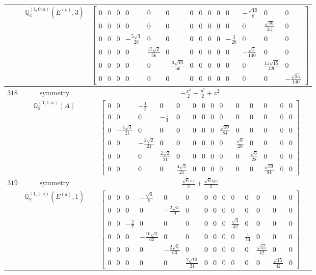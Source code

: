 \documentclass[fleqn,8pt,landscape]{jsarticle}
\begin{document}
\begin{longtable}{ccc}
$  $ & $ \mathbb{Q}_{4}^{(1,0;a)}(E^{(b)},3) $ & $ \begin{bmatrix} 0 & 0 & 0 & 0 & 0 & 0 & 0 & 0 & 0 & 0 & 0 & - \frac{\sqrt{10}}{8} & 0 & 0 \\ 0 & 0 & 0 & 0 & 0 & 0 & 0 & 0 & 0 & 0 & 0 & 0 & \frac{\sqrt{30}}{24} & 0 \\ 0 & 0 & 0 & - \frac{5 \sqrt{3}}{28} & 0 & 0 & 0 & 0 & 0 & 0 & - \frac{3}{28} & 0 & 0 & 0 \\ 0 & 0 & 0 & 0 & \frac{15 \sqrt{2}}{56} & 0 & 0 & 0 & 0 & 0 & 0 & - \frac{\sqrt{5}}{140} & 0 & 0 \\ 0 & 0 & 0 & 0 & 0 & - \frac{3 \sqrt{10}}{56} & 0 & 0 & 0 & 0 & 0 & 0 & \frac{11 \sqrt{15}}{420} & 0 \\ 0 & 0 & 0 & 0 & 0 & 0 & 0 & 0 & 0 & 0 & 0 & 0 & 0 & - \frac{\sqrt{35}}{140} \end{bmatrix} $ \\ \hline
$ 318 $ & $ \text{symmetry} $ & $ - \frac{x^{2}}{2} - \frac{y^{2}}{2} + z^{2} $ \\
$  $ & $ \mathbb{Q}_{2}^{(1,1;a)}(A) $ & $ \begin{bmatrix} 0 & 0 & - \frac{1}{3} & 0 & 0 & 0 & 0 & 0 & 0 & 0 & 0 & 0 & 0 & 0 \\ 0 & 0 & 0 & - \frac{1}{3} & 0 & 0 & 0 & 0 & 0 & 0 & 0 & 0 & 0 & 0 \\ 0 & - \frac{4 \sqrt{3}}{21} & 0 & 0 & 0 & 0 & 0 & 0 & \frac{\sqrt{30}}{84} & 0 & 0 & 0 & 0 & 0 \\ 0 & 0 & - \frac{2 \sqrt{2}}{21} & 0 & 0 & 0 & 0 & 0 & 0 & \frac{\sqrt{6}}{28} & 0 & 0 & 0 & 0 \\ 0 & 0 & 0 & \frac{2 \sqrt{2}}{21} & 0 & 0 & 0 & 0 & 0 & 0 & \frac{\sqrt{6}}{28} & 0 & 0 & 0 \\ 0 & 0 & 0 & 0 & \frac{4 \sqrt{3}}{21} & 0 & 0 & 0 & 0 & 0 & 0 & \frac{\sqrt{30}}{84} & 0 & 0 \end{bmatrix} $ \\ \hline
$ 319 $ & $ \text{symmetry} $ & $ \frac{\sqrt{6} x z}{2} + \frac{\sqrt{6} i y z}{2} $ \\
$  $ & $ \mathbb{Q}_{2}^{(1,1;a)}(E^{(a)},1) $ & $ \begin{bmatrix} 0 & 0 & 0 & - \frac{\sqrt{6}}{9} & 0 & 0 & 0 & 0 & 0 & 0 & 0 & 0 & 0 & 0 \\ 0 & 0 & 0 & 0 & - \frac{2 \sqrt{3}}{9} & 0 & 0 & 0 & 0 & 0 & 0 & 0 & 0 & 0 \\ 0 & 0 & - \frac{2}{7} & 0 & 0 & 0 & 0 & 0 & 0 & \frac{\sqrt{3}}{42} & 0 & 0 & 0 & 0 \\ 0 & 0 & 0 & - \frac{10 \sqrt{3}}{63} & 0 & 0 & 0 & 0 & 0 & 0 & \frac{1}{14} & 0 & 0 & 0 \\ 0 & 0 & 0 & 0 & - \frac{2 \sqrt{6}}{63} & 0 & 0 & 0 & 0 & 0 & 0 & \frac{\sqrt{15}}{42} & 0 & 0 \\ 0 & 0 & 0 & 0 & 0 & \frac{2 \sqrt{10}}{21} & 0 & 0 & 0 & 0 & 0 & 0 & \frac{\sqrt{15}}{42} & 0 \end{bmatrix} $ \\ \hline

\end{longtable}
\end{document}
